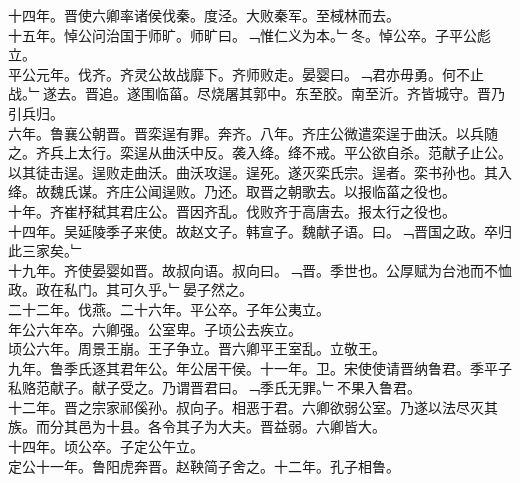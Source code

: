 \documentclass{zhvt-classic}
\begin{document}
\hspace*{2em}十四年。晋使六卿率诸侯伐秦。度泾。大败秦军。至棫林而去。\\
\hspace*{2em}十五年。悼公问治国于师旷。师旷曰。﹁惟仁义为本。﹂冬。悼公卒。子平公彪立。\\
\hspace*{2em}平公元年。伐齐。齐灵公故战靡下。齐师败走。晏婴曰。﹁君亦毋勇。何不止战。﹂遂去。晋追。遂围临菑。尽烧屠其郭中。东至胶。南至沂。齐皆城守。晋乃引兵归。\\
\hspace*{2em}六年。鲁襄公朝晋。晋栾逞有罪。奔齐。八年。齐庄公微遣栾逞于曲沃。以兵随之。齐兵上太行。栾逞从曲沃中反。袭入绛。绛不戒。平公欲自杀。范献子止公。以其徒击逞。逞败走曲沃。曲沃攻逞。逞死。遂灭栾氏宗。逞者。栾书孙也。其入绛。故魏氏谋。齐庄公闻逞败。乃还。取晋之朝歌去。以报临菑之役也。\\
\hspace*{2em}十年。齐崔杼弑其君庄公。晋因齐乱。伐败齐于高唐去。报太行之役也。\\
\hspace*{2em}十四年。吴延陵季子来使。故赵文子。韩宣子。魏献子语。曰。﹁晋国之政。卒归此三家矣。﹂\\
\hspace*{2em}十九年。齐使晏婴如晋。故叔向语。叔向曰。﹁晋。季世也。公厚赋为台池而不恤政。政在私门。其可久乎。﹂晏子然之。\\
\hspace*{2em}二十二年。伐燕。二十六年。平公卒。子年公夷立。\\
\hspace*{2em}年公六年卒。六卿强。公室卑。子顷公去疾立。\\
\hspace*{2em}顷公六年。周景王崩。王子争立。晋六卿平王室乱。立敬王。\\
\hspace*{2em}九年。鲁季氏逐其君年公。年公居干侯。十一年。卫。宋使使请晋纳鲁君。季平子私赂范献子。献子受之。乃谓晋君曰。﹁季氏无罪。﹂不果入鲁君。\\
\hspace*{2em}十二年。晋之宗家祁傒孙。叔向子。相恶于君。六卿欲弱公室。乃遂以法尽灭其族。而分其邑为十县。各令其子为大夫。晋益弱。六卿皆大。\\
\hspace*{2em}十四年。顷公卒。子定公午立。\\
\hspace*{2em}定公十一年。鲁阳虎奔晋。赵鞅简子舍之。十二年。孔子相鲁。\\
\end{document}
